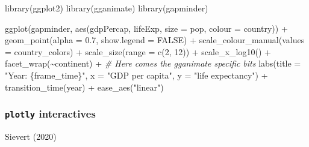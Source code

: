 \documentclass[
]{article}
\newenvironment{Shaded}{\begin{snugshade}}{\end{snugshade}}
\newcommand{\AttributeTok}[1]{\textcolor[rgb]{0.77,0.63,0.00}{#1}}
\newcommand{\CommentTok}[1]{\textcolor[rgb]{0.56,0.35,0.01}{\textit{#1}}}
\newcommand{\ConstantTok}[1]{\textcolor[rgb]{0.00,0.00,0.00}{#1}}
\newcommand{\DecValTok}[1]{\textcolor[rgb]{0.00,0.00,0.81}{#1}}
\newcommand{\FloatTok}[1]{\textcolor[rgb]{0.00,0.00,0.81}{#1}}
\newcommand{\FunctionTok}[1]{\textcolor[rgb]{0.00,0.00,0.00}{#1}}
\newcommand{\NormalTok}[1]{#1}
\newcommand{\SpecialCharTok}[1]{\textcolor[rgb]{0.00,0.00,0.00}{#1}}
\newcommand{\StringTok}[1]{\textcolor[rgb]{0.31,0.60,0.02}{#1}}
\begin{document}
\begin{Shaded}
\begin{Highlighting}[]
\FunctionTok{library}\NormalTok{(ggplot2)}
\FunctionTok{library}\NormalTok{(gganimate)}
\FunctionTok{library}\NormalTok{(gapminder)}

\FunctionTok{ggplot}\NormalTok{(gapminder, }\FunctionTok{aes}\NormalTok{(gdpPercap, lifeExp, }\AttributeTok{size =}\NormalTok{ pop, }\AttributeTok{colour =}\NormalTok{ country)) }\SpecialCharTok{+}
    \FunctionTok{geom\_point}\NormalTok{(}\AttributeTok{alpha =} \FloatTok{0.7}\NormalTok{, }\AttributeTok{show.legend =} \ConstantTok{FALSE}\NormalTok{) }\SpecialCharTok{+} \FunctionTok{scale\_colour\_manual}\NormalTok{(}\AttributeTok{values =}\NormalTok{ country\_colors) }\SpecialCharTok{+}
    \FunctionTok{scale\_size}\NormalTok{(}\AttributeTok{range =} \FunctionTok{c}\NormalTok{(}\DecValTok{2}\NormalTok{, }\DecValTok{12}\NormalTok{)) }\SpecialCharTok{+} \FunctionTok{scale\_x\_log10}\NormalTok{() }\SpecialCharTok{+} \FunctionTok{facet\_wrap}\NormalTok{(}\SpecialCharTok{\textasciitilde{}}\NormalTok{continent) }\SpecialCharTok{+}
    \CommentTok{\# Here comes the gganimate specific bits}
\FunctionTok{labs}\NormalTok{(}\AttributeTok{title =} \StringTok{"Year: \{frame\_time\}"}\NormalTok{, }\AttributeTok{x =} \StringTok{"GDP per capita"}\NormalTok{, }\AttributeTok{y =} \StringTok{"life expectancy"}\NormalTok{) }\SpecialCharTok{+}
    \FunctionTok{transition\_time}\NormalTok{(year) }\SpecialCharTok{+} \FunctionTok{ease\_aes}\NormalTok{(}\StringTok{"linear"}\NormalTok{)}
\end{Highlighting}
\end{Shaded}

\hypertarget{plotly-interactives}{%
\subsubsection{\texorpdfstring{\texttt{plotly}
interactives}{plotly interactives}}\label{plotly-interactives}}

Sievert (2020)
\end{document}
